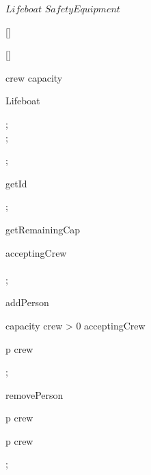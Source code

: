 \kClass $Lifeboat$ \kISO $SafetyEquipment$
\par
\kInstanceVarDef
\parlinebr
\begin{insvar}
\end{insvar}
\begin{insvar}
\end{insvar}
\begin{insvar}
[{\set{}}]
\end{insvar}
\begin{insvar}
[{\set{}}]
\end{insvar}
\begin{instinvfn}
 \Card crew \Le capacity\end{instinvfn}
\par
\kOperations
{}\begin{op}[e]{Lifeboat}%
\signature{\Nat  \X Bid \Oto Lifeboat}
\begin{blockstmt}
 ; \\
 ; \\
\end{blockstmt};
\end{op}
\begin{op}[e]{getId}%
\signature{() \Oto Bid}
\parms{}
;
\end{op}
\begin{op}[e]{getRemainingCap}%
\signature{() \Oto \Nat }
\parms{}
\If acceptingCrew
\Then \\
\Else \\
\Fi;
\end{op}
\begin{op}[e]{addPerson}%
\signature{Pid \Oto ()}
\begin{precond}
capacity \Minus  \Card crew > 0 \And acceptingCrew
\end{precond}
\begin{postcond}
p \In crew
\end{postcond};
\end{op}
\begin{op}[e]{removePerson}%
\signature{Pid \Oto ()}
\begin{precond}
p \In crew
\end{precond}
\begin{postcond}
p \Notin crew
\end{postcond};
\end{op}
